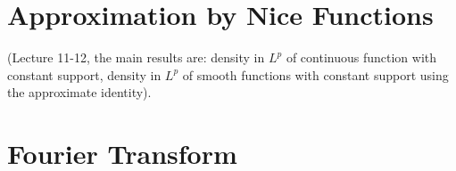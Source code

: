\documentclass{article}
\numberwithin{equation}{section}
\begin{document}
\newpage

\section{Approximation by Nice Functions}
(Lecture 11-12, the main results are: density in $L^p$ of continuous function with constant support, density in $L^p$ of smooth functions with constant support using the approximate identity).

\newpage

\section{Fourier Transform}
\end{document}

